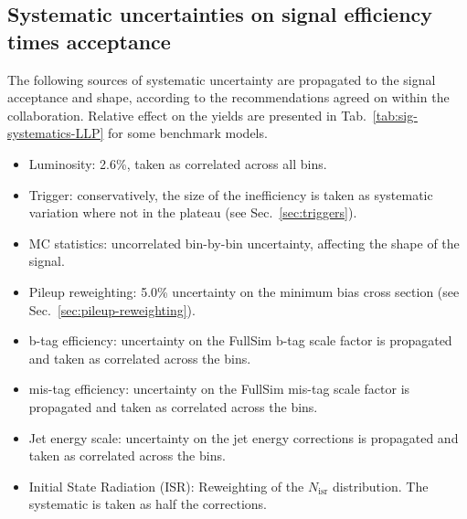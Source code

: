 \clearpage
\subsection{Systematic uncertainties on signal efficiency times acceptance}
\label{sec:sig-syst-LLP}

The following sources of systematic uncertainty are propagated to the
signal acceptance and shape, according to the recommendations agreed
on within the collaboration. Relative effect on the yields are
presented in Tab.~\ref{tab:sig-systematics-LLP} for some benchmark
models.

\begin{itemize}
    \item Luminosity: 2.6\%, taken as correlated across all bins.
    \item Trigger: conservatively, the size of the inefficiency is taken as
        systematic variation where not in the plateau (see Sec.~\ref{sec:triggers}).
    \item MC statistics:  uncorrelated bin-by-bin uncertainty, affecting the
        shape of the signal.
    \item Pileup reweighting: 5.0\% uncertainty on the minimum bias cross section
        (see Sec.~\ref{sec:pileup-reweighting}).
    \item b-tag efficiency: uncertainty on the FullSim b-tag scale
        factor is propagated and taken as correlated across the bins.
    \item mis-tag efficiency: uncertainty on the FullSim mis-tag scale
        factor is propagated and taken as correlated across the bins.
    \item Jet energy scale: uncertainty on the jet energy corrections is
        propagated and taken as correlated across the bins.
    \item Initial State Radiation (ISR): Reweighting of the $N_{\text{isr}}$
        distribution. The systematic is taken as half the corrections.
\end{itemize}

